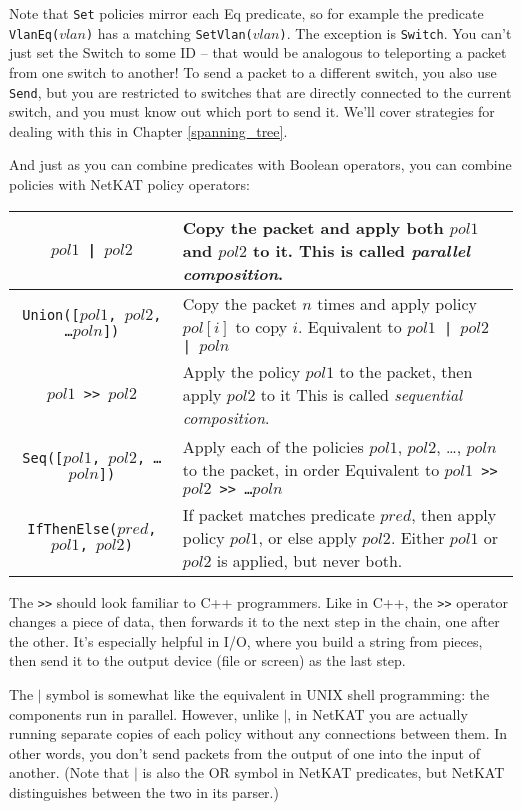 Note that \texttt{Set} policies mirror each Eq predicate, so for example the predicate \texttt{VlanEq($vlan$)} has a matching
\texttt{SetVlan($vlan$)}.
The exception is \texttt{Switch}.  
You can't just set the Switch to some ID -- that would be analogous to teleporting a packet from one 
switch to another!
To send a packet to a different switch, you also use \texttt{Send}, but you are restricted to switches that are directly
connected to the current switch, and you must know out which port to send it.
We'll cover strategies for dealing with this in Chapter \ref{spanning_tree}.
 
And just as you can combine predicates with Boolean operators, you can combine policies with NetKAT 
policy operators:

\bigskip
\begin{tabularx}{\linewidth}{|c|X|}
\hline\hline
\texttt{$pol1$ | $pol2$} & Copy the packet and apply both $pol1$ and $pol2$ to it.   
This is called \textit{parallel composition}.
\\ \hline  
\texttt{Union([$pol1$, $pol2$, \ldots $poln$])} & 
Copy the packet $n$ times and apply policy $pol[i]$ to copy $i$.
Equivalent to \texttt{$pol1$ | $pol2$ | $poln$}
\\ \hline  
\texttt{$pol1$ >> $pol2$} & Apply the policy $pol1$ to the packet, then apply $pol2$ to it
This is called \textit{sequential composition}.
\\ \hline  
\texttt{Seq([$pol1$, $pol2$, \ldots $poln$])} & 
Apply each of the policies $pol1$, $pol2$, \ldots, $poln$ to the packet, in order 
Equivalent to \texttt{$pol1$ >> $pol2$ >> \ldots $poln$}
\\ \hline  
\texttt{IfThenElse($pred$, $pol1$, $pol2$)} & If packet matches predicate $pred$, then apply policy $pol1$, or else
apply $pol2$.  
Either $pol1$ or $pol2$ is applied, but never both.
\\ \hline\hline
\end{tabularx}

\bigskip

The \texttt{>>} should look familiar to C++ programmers. 
Like in C++, the \texttt{>>} operator changes a piece of data, then forwards it to the next step in the chain, one
after the other.
It's especially helpful in I/O, where you build a string from pieces, then send it to the output device (file or screen) as the
last step.

The $\vert$ symbol is somewhat like the equivalent in UNIX shell programming: the components run in parallel.
However, unlike $\vert$, in NetKAT you are actually running separate copies of each policy without any connections
between them.
In other words, you don't send packets from the output of one into the input of another.
(Note that $\vert$ is also the OR symbol in NetKAT predicates, but NetKAT distinguishes between the two in
its parser.)

